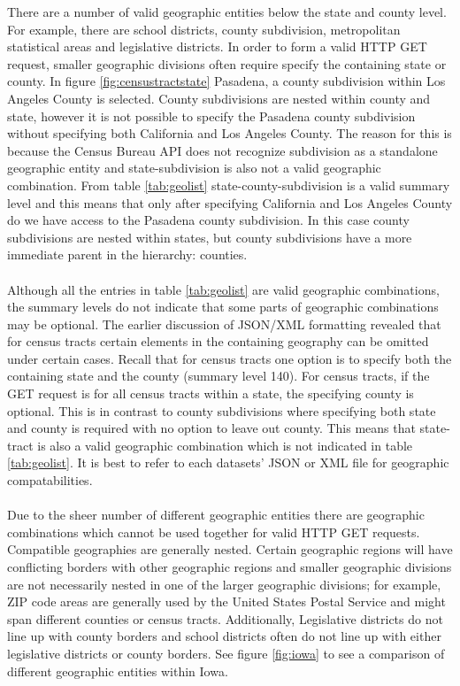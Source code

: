 \documentclass{article}\usepackage[]{graphicx}\usepackage[]{color}
\begin{document}
There are a number of valid geographic entities below the state and county level.  For example, there are school districts, county subdivision, metropolitan statistical areas and legislative districts.  In order to form a valid HTTP GET request, smaller geographic divisions often require specify the containing state or county.  In figure \ref{fig:censustractstate} Pasadena, a county subdivision within Los Angeles County is selected.  County subdivisions are nested within county and state, however it is not possible to specify the Pasadena county subdivision without specifying both California and Los Angeles County.  The reason for this is because the Census Bureau API does not recognize subdivision as a standalone geographic entity and state-subdivision is also not a valid geographic combination.  From table \ref{tab:geolist} state-county-subdivision is a valid summary level and this means that only after specifying California and Los Angeles County do we have access to the Pasadena county subdivision.  In this case county subdivisions are nested within states, but county subdivisions have a more immediate parent in the hierarchy: counties.\\
\\
Although all the entries in table \ref{tab:geolist} are valid geographic combinations, the summary levels do not indicate that some parts of geographic combinations may be optional.  The earlier discussion of JSON/XML formatting revealed that for census tracts certain elements in the containing geography can be omitted under certain cases.  Recall that for census tracts one option is to specify both the containing state and the county (summary level 140).  For census tracts, if the GET request is for all census tracts within a state, the specifying county is optional.  This is in contrast to county subdivisions where specifying both state and county is required with no option to leave out county.  This means that state-tract is also a valid geographic combination which is not indicated in table \ref{tab:geolist}.  It is best to refer to each datasets' JSON or XML file for geographic compatabilities.\\
\\
Due to the sheer number of different geographic entities there are geographic combinations which cannot be used together for valid HTTP GET requests.  Compatible geographies are generally nested.  Certain geographic regions will have conflicting borders with other geographic regions and smaller geographic divisions are not necessarily nested in one of the larger geographic divisions; for example, ZIP code areas are generally used by the United States Postal Service and might span different counties or census tracts.  Additionally, Legislative districts do not line up with county borders and school districts often do not line up with either legislative districts or county borders.  See figure \ref{fig:iowa} to see a comparison of different geographic entities within Iowa.\\
\end{document}

